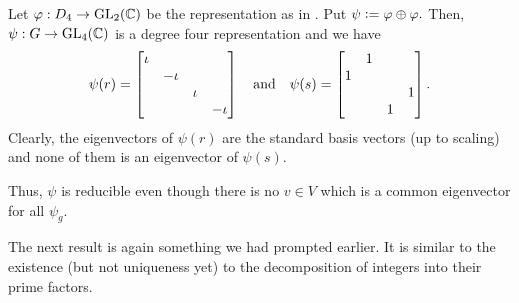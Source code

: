 \begin{ex} \label{ex:deg4repredbutnocommoneigen}
	Let $\varphi:D_4 \to \operatorname{GL}_2(\mathbb{C})$ be the representation as in . Put $\psi \vcentcolon= \varphi \oplus \varphi.$ Then, $\psi: G \to \operatorname{GL}_4(\mathbb{C})$ is a degree four representation and we have
	\begin{equation*} 
		\psi(r) = \begin{bmatrix}
			\iota & & & \\
			 & -\iota & & \\
			 & & \iota & \\
			 & & & -\iota \\
		\end{bmatrix} \quad\text{and}\quad \psi(s) = \begin{bmatrix}
			 & 1 & & \\
			 1 & & & \\
			 & & & 1 \\
			 & & 1 & \\
		\end{bmatrix}.
	\end{equation*}
	Clearly, the eigenvectors of $\psi(r)$ are the standard basis vectors (up to scaling) and none of them is an eigenvector of $\psi(s).$

	Thus, $\psi$ is reducible even though there is no $v \in V$ which is a common eigenvector for all $\psi_g.$
\end{ex}

The next result is again something we had prompted earlier. It is similar to the existence (but not uniqueness yet) to the decomposition of integers into their prime factors.

